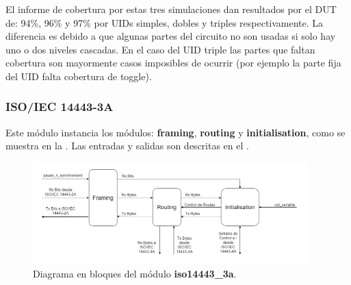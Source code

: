 \documentclass[a4paper, twoside, 11pt]{report}
\begin{document}
El informe de cobertura por estas tres simulaciones dan resultados por el DUT de: 94\%, 96\% y 97\% por UIDs simples, dobles y triples respectivamente. La diferencia es debido a que algunas partes del circuito no son usadas si solo hay uno o dos niveles cascadas. En el caso del UID triple las partes que faltan cobertura son mayormente casos imposibles de ocurrir (por ejemplo la parte fija del UID falta cobertura de toggle).

\FloatBarrier
\subsubsection{ISO/IEC 14443-3A}

Este módulo instancia los módulos: \textbf{framing}, \textbf{routing} y \textbf{initialisation}, como se muestra en la . Las entradas y salidas son descritas en el .

\begin{figure}[htb]
  \centering
  \includegraphics[width=0.95\textwidth]{./img/iso14443_3a.drawio}
  \caption{Diagrama en bloques del módulo \textbf{iso14443\_3a}.}
  \label{fig:iso14443_3a}
\end{figure}
\end{document}
